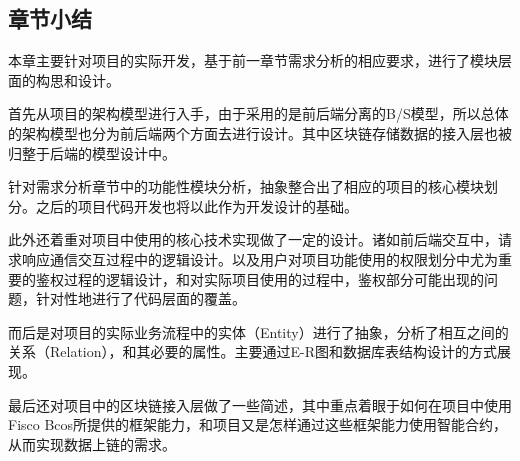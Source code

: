 \subsection{章节小结}
本章主要针对项目的实际开发，基于前一章节需求分析的相应要求，进行了模块层面的构思和设计。

首先从项目的架构模型进行入手，由于采用的是前后端分离的B/S模型，所以总体的架构模型也分为前后端两个方面去进行设计。其中区块链存储数据的接入层也被归整于后端的模型设计中。

针对需求分析章节中的功能性模块分析，抽象整合出了相应的项目的核心模块划分。之后的项目代码开发也将以此作为开发设计的基础。

此外还着重对项目中使用的核心技术实现做了一定的设计。诸如前后端交互中，请求响应通信交互过程中的逻辑设计。以及用户对项目功能使用的权限划分中尤为重要的鉴权过程的逻辑设计，和对实际项目使用的过程中，鉴权部分可能出现的问题，针对性地进行了代码层面的覆盖。

而后是对项目的实际业务流程中的实体（Entity）进行了抽象，分析了相互之间的关系（Relation），和其必要的属性。主要通过E-R图和数据库表结构设计的方式展现。

最后还对项目中的区块链接入层做了一些简述，其中重点着眼于如何在项目中使用Fisco Bcos所提供的框架能力，和项目又是怎样通过这些框架能力使用智能合约，从而实现数据上链的需求。